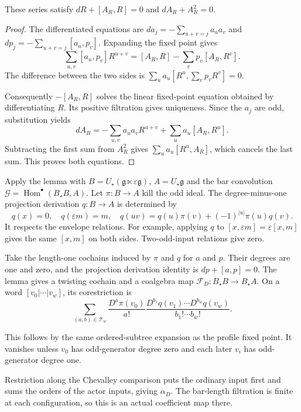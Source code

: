 \begin{lemma}\label{cbc:va:covariant-substitution}
These series satisfy
$dR+[A_R,R]=0$ and $dA_R+A_R^2=0$.
\end{lemma}
\begin{proof}
The differentiated equations are
$da_j=-\sum_{u+v=j}a_ua_v$ and
$dp_j=-\sum_{u+v=j}[a_u,p_v]$.
Expanding the fixed point gives
\[
 \sum_{u,v}[a_u,p_v]R^{u+v}
 =[A_R,R]-\sum_vp_v[A_R,R^v].
\]
The difference between the two sides is
$\sum_u a_u[R^u,\sum_vp_vR^v]=0$.

Consequently $-[A_R,R]$ solves the linear
fixed-point equation obtained by differentiating
$R$. Its positive filtration gives uniqueness.
Since the $a_j$ are odd, substitution yields
\[
 dA_R=-\sum_{u,v}a_ua_vR^{u+v}
                         +\sum_u a_u[A_R,R^u].
\]
Subtracting the first sum from $A_R^2$ gives
$\sum_u a_u[R^u,A_R]$, which cancels the
last sum. This proves both equations.
\end{proof}

Apply the lemma with
$B=U_\star(\mathfrak g\ltimes\varepsilon\mathfrak g)$,
$A=U_\star\mathfrak g$ and the bar convolution
$\mathcal G=\operatorname{Hom}^\bullet(B_\star B,A)$.
Let $\pi:B\to A$ kill the odd ideal.
The degree-minus-one projection derivation
$q:B\to A$ is determined by
\[
 q(x)=0,\quad q(\varepsilon m)=m,\quad
 q(uv)=q(u)\pi(v)+(-1)^{|u|}\pi(u)q(v).
\]
It respects the envelope relations.
For example, applying $q$ to
$[x,\varepsilon m]=\varepsilon[x,m]$
gives the same $[x,m]$ on both sides.
Two-odd-input relations give zero.

Take the length-one cochains induced by $\pi$
and $q$ for $a$ and $p$. Their degrees are
one and zero, and the projection derivation
identity is $dp+[a,p]=0$.
The lemma gives a twisting cochain and a
coalgebra map
$\mathcal F_D:B_\star B\to B_\star A$.
On a word $[v_0|\cdots|v_w]$, its corestriction is
\begin{equation}\label{cbc:va:bar-tree}
 \sum_{(a,b)\in\mathcal T_w}
 \frac{D^a\pi(v_0)}{a!}
 \frac{D^{b_1}q(v_1)\cdots D^{b_w}q(v_w)}
      {b_1!\cdots b_w!}.
\end{equation}

This follows by the same ordered-subtree
expansion as the profile fixed point.
It vanishes unless $v_0$ has odd-generator
degree zero and each later $v_i$ has
odd-generator degree one.

Restriction along the Chevalley comparison
puts the ordinary input first and sums the
orders of the actor inputs, giving $\alpha_D$.
The bar-length filtration is finite at each
configuration, so this is an actual coefficient
map there.

